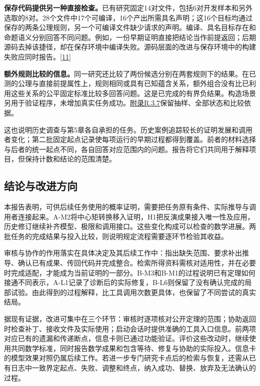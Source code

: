 \textbf{保存代码提供另一种直接检查。}已有研究固定14对文件，包括6对开发样本和另外选取的8对。28个文件中17个可编译，16个产出所需具名声明；这16个目标均通过保存的两条公理规则，另一个可编译文件缺少请求的声明。编译、具名目标存在和命题语义分别回答不同问题。例如，一份早期证明直接把结论当作前提返回；后期源码去掉该捷径，却在保存环境中编译失败。源码层面的改进与保存环境中的构建失败应同时报告。\hyperlink{ref-11}{\mbox{[11]}}

\textbf{额外规则比较的信息。}同一研究还比较了两份候选分别在两套规则下的结果。在已测的公理与直接前提属性上，规则相同或具有已知蕴含关系，额外组合没有比已利用这些关系的公平固定标准比较多回答问题。这是已完成的有界负结果。构造场景另用于验证程序，未增加真实任务成功。\href{zh-appendix.pdf\#r3-7}{附录R.3.7}保留抽样、全部状态和比较依据。

这也说明历史调查与第5章各自承担的任务。历史案例追踪较长的证明发展和调用者变化；第二批固定起点记录使每项运行的早期过程都得到覆盖。前者的材料选择与后者的统一起点不同，各自回答对应范围内的问题。报告将它们共同用于解释项目，但保持计数和结论的范围清楚。

\subsection[结论与改进方向]{\texorpdfstring{\protect\hypertarget{section-6-4}{}结论与改进方向}{结论与改进方向}}
本报告表明，可供后续任务使用的概率证明，需要把任务原有条件、实际推导与调用者连接起来。A-M2将中心矩转换移入证明，H1把反演成果接入唯一性及应用，历史修订继续补齐模型、极限和调用接口。这些变化构成可以检查的数学进展。两批任务的完成结果与投入比较，则说明规定流程需要逐环节检验其收益。

审核与协作的作用落实在具体决定及其后续工作中：指出缺失范围、要求补出推导、确认已有成果、传回代码并完成整合。检索所得资料需核对适用性，并在必要时完成适配，才能成为当前证明的一部分。B-M3和B-M1的过程说明已有定理如何接通不同表示，A-L1记录了诊断后的实际修复，B-L6则保留了没有确认完成的局部试验。由此得到的过程解释，比工具调用次数更具体，也保留了不同尝试的真实结局。

据现有证据，改进可集中在三个环节：审核时逐项核对公开定理的范围；协助返回时检查补丁、接收文件及实际使用；启动会话时提供准确的工具入口信息。前两项对应已有的遗漏和传递断点，信息卡则已通过功能验证。评价这些改动时，继续使用共同数学标准，同时报告数学成果和包含等待、修复与协助的实际投入。信息卡的模型效果对照仍属后续工作。若进一步专门研究卡点后的检索与恢复，还需从已有日志中一致界定起点、失败、调整和终点，纳入成功、替换、放弃及无法确认的过程。

